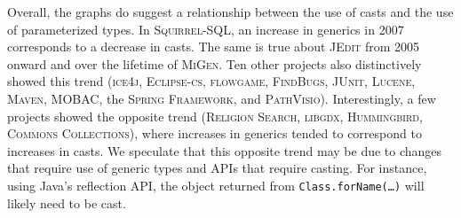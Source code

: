 \documentclass{svjour3}
\newcommand{\squirrelsql}{\textsc{Squirrel-SQL}\xspace}
\newcommand{\eclipsecs}{\textsc{Eclipse-cs}\xspace}
\newcommand{\jedit}{\textsc{JEdit}\xspace}
\newcommand{\spring}{the \textsc{Spring Framework}\xspace}
\newcommand{\junit}{\textsc{JUnit}\xspace}
\newcommand{\maven}{\textsc{Maven}\xspace}
\newcommand{\lucene}{\textsc{Lucene}\xspace}
\newcommand{\commons}{\textsc{Commons Collections}\xspace}
\newcommand{\findbugs}{\textsc{FindBugs}\xspace}
\newcommand{\flowgame}{\textsc{flowgame}\xspace}
\newcommand{\hummingbird}{\textsc{Hummingbird}\xspace}
\newcommand{\ice}{\textsc{ice4j}\xspace}
\newcommand{\libgdx}{\textsc{libgdx}\xspace}
\newcommand{\migen}{\textsc{MiGen}\xspace}
\newcommand{\mobac}{\textsc{MOBAC}\xspace}
\newcommand{\pathvisio}{\textsc{PathVisio}\xspace}
\newcommand{\religion}{\textsc{Religion Search}\xspace}
\begin{document}
Overall, the graphs do suggest a relationship between the use of casts
and the use of parameterized types.
In \squirrelsql, an increase in generics in 2007 corresponds to a 
decrease in casts.
The same is true about \jedit from 2005 onward and over the lifetime of \migen. 
Ten other projects also distinctively showed this trend
(\ice,
\eclipsecs,
\flowgame,
\findbugs,
\junit,
\lucene,
\maven,
\mobac,
\spring, and
\pathvisio).
Interestingly, a few projects showed the opposite trend
(\religion, \libgdx, \hummingbird, \commons), where increases in generics
tended to correspond to increases in casts.
We speculate that this opposite trend may be due to 
changes that require use of generic types and 
APIs that require casting.
For instance, using Java's reflection API, 
the object returned from \texttt{Class.forName(\ldots)} 
will likely need to be cast.
% 
\end{document}

